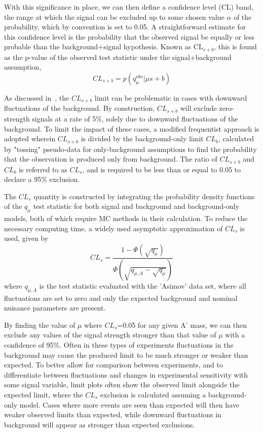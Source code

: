 With this significance in place, we can then define a confidence level (CL) band, the range at which the signal can be excluded up to some chosen value $\alpha$ of the probability, which by convention is set to 0.05.
A straightforward estimate for this confidence level is the probability that the observed signal be equally or less probable than the background+signal hypothesis.
Known as CL$_{s+b}$, this is found as the p-value of the observed test statistic under the signal+background assumption,
\begin{equation}
	CL_{s+b} = p(q_{\mu}^{obs}|\mu s +b)
\end{equation}

As discussed in~\cite{ATLAS:2011tau}, the $CL_{s+b}$ limit can be problematic in cases with downward fluctuations of the background. 
By construction, $CL_{s+b}$ will exclude zero-strength signals at a rate of 5$\%$, solely due to downward fluctuations of the background.
To limit the impact of these cases, a modified frequentist approach is adopted wherein $CL_{s+b}$ is divided by the background-only limit $CL_b$, calculated by "tossing" pseudo-data for only-background assumptions to find the probability that the observation is produced only from background.
The ratio of $CL_{s+b}$ and $CL_{b}$ is referred to as $CL_s$, and is required to be less than or equal to 0.05 to declare a 95$\%$ exclusion. 

The $CL_s$ quantity is constructed by integrating the probability density functions of the $q_\mu$ test statistic for both signal and background and background-only models, both of which require MC methods in their calculation. 
To reduce the necessary computing time, a widely used asymptotic approximation of $CL_s$ is used, given by
\begin{equation}
	CL_s = \frac{1-\Phi(\sqrt{q_\mu})}{\Phi(\sqrt{q_{\mu,A}-\sqrt{q_\mu}})}
\end{equation}
where $q_{\mu,A}$ is the test statistic evaluated with the 'Asimov' data set, where all fluctuations are set to zero and only the expected background and nominal nuisance parameters are present.

By finding the value of $\mu$ where $CL_s$=0.05 for any given A' mass, we can then exclude any values of the signal strength stronger than that value of $\mu$ with a confidence of 95$\%$. 
Often in these types of experiments fluctuations in the background may cause the produced limit to be much stronger or weaker than expected. 
To better allow for comparison between experiments, and to differentiate between fluctuations and changes in experimental sensitivity with some signal variable, limit plots often show the observed limit alongside the expected limit, where the $CL_s$ exclusion is calculated assuming a background-only model.
Cases where more events are seen than expected will then have weaker observed limits than expected, while downward fluctuations in background will appear as stronger than expected exclusions.

